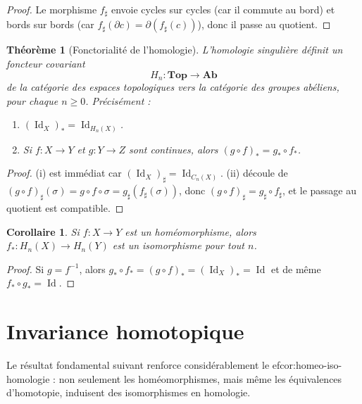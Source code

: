 \documentclass[12pt,a4paper,openany]{book}
\theoremstyle{definition}
\theoremstyle{plain}
\newtheorem{theoreme}[definition]{Théorème}
\newtheorem{corollaire}[definition]{Corollaire}
\theoremstyle{remark}
\DeclareMathOperator{\Id}{Id}
\begin{document}
\begin{proof}
Le morphisme $f_\sharp$ envoie cycles sur cycles (car il commute au bord) et bords sur bords
(car $f_\sharp(\partial c) = \partial(f_\sharp(c))$), donc il passe au quotient.
\end{proof}

\begin{theoreme}[Fonctorialité de l'homologie]\label{thm:fonctorialite-homologie}
L'homologie singulière définit un foncteur covariant
\[
  H_n \colon \mathbf{Top} \longrightarrow \mathbf{Ab}
\]
de la catégorie des espaces topologiques vers la catégorie des groupes abéliens, pour chaque $n \geq 0$.
Précisément :
\begin{enumerate}[label=(\roman*)]
  \item $(\Id_X)_* = \Id_{H_n(X)}$.
  \item Si $f \colon X \to Y$ et $g \colon Y \to Z$ sont continues, alors $(g \circ f)_* = g_* \circ f_*$.
\end{enumerate}
\end{theoreme}

\begin{proof}
(i) est immédiat car $(\Id_X)_\sharp = \Id_{C_n(X)}$.
(ii) découle de $(g \circ f)_\sharp(\sigma) = g \circ f \circ \sigma = g_\sharp(f_\sharp(\sigma))$,
donc $(g \circ f)_\sharp = g_\sharp \circ f_\sharp$, et le passage au quotient est compatible.
\end{proof}

\begin{corollaire}\label{cor:homeo-iso-homologie}
Si $f \colon X \to Y$ est un homéomorphisme, alors $f_* \colon H_n(X) \to H_n(Y)$ est un
isomorphisme pour tout $n$.
\end{corollaire}

\begin{proof}
Si $g = f^{-1}$, alors $g_* \circ f_* = (g \circ f)_* = (\Id_X)_* = \Id$ et de même
$f_* \circ g_* = \Id$.
\end{proof}

\section{Invariance homotopique}\label{sec:invariance-homotopique}

Le résultat fondamental suivant renforce considérablement le 
ef{cor:homeo-iso-homologie} : non seulement
les homéomorphismes, mais même les équivalences d'homotopie, induisent des isomorphismes en homologie.
\end{document}
